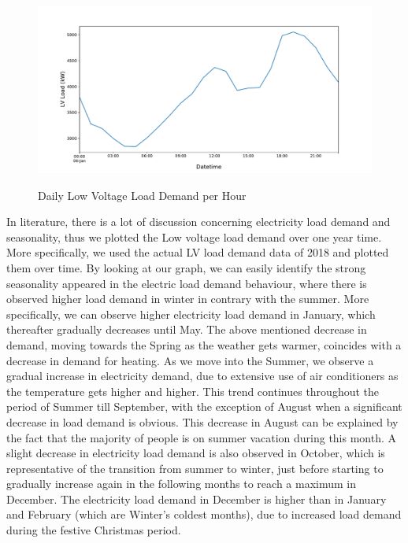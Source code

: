 \begin{figure}[h!]
\centering
\includegraphics[width=1\linewidth]{project/eda4.pdf}
\label{fig:felix}
\caption{Daily Low Voltage Load Demand per Hour}
\end{figure}
\par In literature, there is a lot of discussion concerning electricity load demand and seasonality, thus we plotted the Low voltage load demand over one year time. More specifically, we used the actual LV load demand data of 2018 and plotted them over time. By looking at our graph, we can easily identify the strong seasonality appeared in the electric load demand behaviour, where there is observed higher load demand in winter in contrary with the summer. More specifically, we can observe higher electricity load demand in January, which thereafter gradually decreases until May. The above mentioned decrease in demand, moving towards the Spring as the weather gets warmer, coincides with a decrease in demand for heating.  As we move into the Summer, we observe a gradual increase in electricity demand, due to extensive use of air conditioners as the temperature gets higher and higher. This trend continues throughout the period of Summer till September, with the exception of August when a significant decrease in load demand is obvious. This decrease in August can be explained by the fact that the majority of people is on summer vacation during this month. A slight decrease in electricity load demand is also observed in October, which is representative of the transition from summer to winter, just before starting to gradually increase again in the following months to reach a maximum in December. The electricity load demand in December is higher than in January and February (which are Winter's coldest months), due to increased load demand during the festive Christmas period. 

